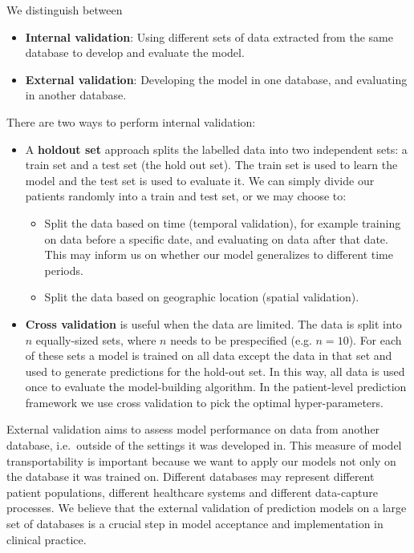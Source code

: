\documentclass[11pt]{book}
\providecommand{\tightlist}{%
  \setlength{\itemsep}{0pt}\setlength{\parskip}{0pt}}
\theoremstyle{definition}
\theoremstyle{definition}
\theoremstyle{definition}
\theoremstyle{remark}
\begin{document}
We distinguish between

\begin{itemize}
\tightlist
\item
  \textbf{Internal validation}: Using different sets of data extracted
  from the same database to develop and evaluate the model.
\item
  \textbf{External validation}: Developing the model in one database,
  and evaluating in another database.
\end{itemize}

There are two ways to perform internal validation:

\begin{itemize}
\tightlist
\item
  A \textbf{holdout set} approach splits the labelled data into two
  independent sets: a train set and a test set (the hold out set). The
  train set is used to learn the model and the test set is used to
  evaluate it. We can simply divide our patients randomly into a train
  and test set, or we may choose to:

  \begin{itemize}
  \tightlist
  \item
    Split the data based on time (temporal validation), for example
    training on data before a specific date, and evaluating on data
    after that date. This may inform us on whether our model generalizes
    to different time periods.
  \item
    Split the data based on geographic location (spatial validation).
  \end{itemize}
\item
  \textbf{Cross validation} is useful when the data are limited. The
  data is split into \(n\) equally-sized sets, where \(n\) needs to be
  prespecified (e.g. \(n=10\)). For each of these sets a model is
  trained on all data except the data in that set and used to generate
  predictions for the hold-out set. In this way, all data is used once
  to evaluate the model-building algorithm. In the patient-level
  prediction framework we use cross validation to pick the optimal
  hyper-parameters. 
\end{itemize}

External validation aims to assess model performance on data from
another database, i.e.~outside of the settings it was developed in. This
measure of model transportability is important because we want to apply
our models not only on the database it was trained on. Different
databases may represent different patient populations, different
healthcare systems and different data-capture processes. We believe that
the external validation of prediction models on a large set of databases
is a crucial step in model acceptance and implementation in clinical
practice.
\end{document}
